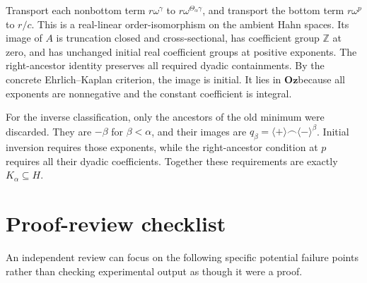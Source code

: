 \documentclass[11pt]{article}
\theoremstyle{definition}
\theoremstyle{remark}
\newcommand{\Oz}{\ensuremath{\mathbf{Oz}}}
\newcommand{\Z}{\mathbb{Z}}
\newcommand{\cat}{\mathbin{\frown}}
\newcommand{\plus}{\langle+\rangle}
\newcommand{\minus}{\langle-\rangle}
\begin{document}
Transport each nonbottom term $r\omega^\gamma$ to
$r\omega^{\Theta_\alpha\gamma}$, and transport the bottom term
$r\omega^p$ to $r/c$. This is a real-linear order-isomorphism on the
ambient Hahn spaces. Its image of $A$ is truncation closed and
cross-sectional, has coefficient group $\Z$ at zero, and has unchanged
initial real coefficient groups at positive exponents. The right-ancestor
identity preserves all required dyadic containments. By the concrete
Ehrlich--Kaplan criterion, the image is initial. It lies in \Oz because
all exponents are nonnegative and the constant coefficient is integral.

For the inverse classification, only the ancestors of the old minimum
were discarded. They are $-\beta$ for $\beta<\alpha$, and their images
are $q_\beta=\plus\cat\minus^\beta$. Initial inversion requires
those exponents, while the right-ancestor condition at $p$ requires all
their dyadic coefficients. Together these requirements are exactly
$K_\alpha\subseteq H$.

\clearpage
\section{Proof-review checklist}\label{isg:app:checklist}
An independent review can focus on the following specific potential
failure points rather than checking experimental output as though it
were a proof.
\end{document}

